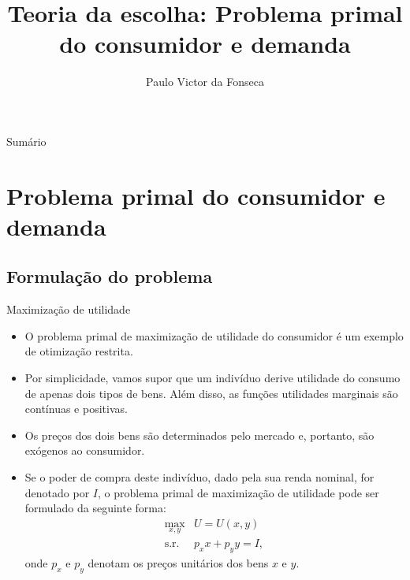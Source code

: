\documentclass[10pt]{beamer}
\title[]{Teoria da escolha: Problema primal do consumidor e demanda}
\author[]{Paulo Victor da Fonseca}
\date{}
\begin{document}
\begin{frame}[plain]
\end{frame}

\begin{frame}{Sumário}
    \tableofcontents
\end{frame}

\section{Problema primal do consumidor e demanda}
\subsection{Formulação do problema}
\begin{frame}{Maximização de utilidade}
    \begin{itemize}
        \item O problema primal de maximização de utilidade do consumidor é um exemplo de otimização restrita.
        \bigskip
        \item Por simplicidade, vamos supor que um indivíduo derive utilidade do consumo de apenas dois tipos de bens. Além disso, as funções utilidades marginais são contínuas e positivas.
        \bigskip
        \item Os preços dos dois bens são determinados pelo mercado e, portanto, são exógenos ao consumidor.
        \bigskip
        \item Se o poder de compra deste indivíduo, dado pela sua renda nominal, for denotado por $I$, o problema primal de maximização de utilidade pode ser formulado da seguinte forma:
        \begin{eqnarray}
        \max_{x,y} & U = U(x,y) \label{eq1}\\
        \text{s.r.} & p_xx + p_yy = I,\nonumber
        \end{eqnarray}
        onde $p_x$ e $p_y$ denotam os preços unitários dos bens $x$ e $y$.
        \end{itemize}
        \end{frame}
        
\end{document}
